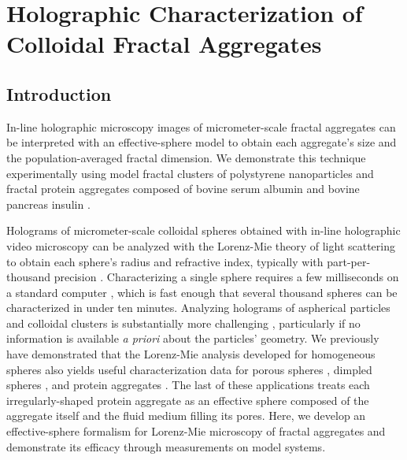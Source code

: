 \chapter{Holographic Characterization of Colloidal Fractal Aggregates}
\label{ch:fractal}

\section{Introduction}

In-line holographic microscopy images of micrometer-scale fractal
aggregates can be interpreted with an effective-sphere model
to obtain each aggregate's size and the population-averaged fractal dimension.
We demonstrate this technique experimentally using
model fractal clusters of polystyrene nanoparticles and 
fractal protein aggregates composed of bovine serum albumin and
bovine pancreas insulin \cite{wang16a}.

Holograms of micrometer-scale colloidal spheres
obtained with in-line holographic video microscopy
can be analyzed with the Lorenz-Mie theory of light
scattering to obtain each sphere's radius and refractive index,
typically with part-per-thousand precision \cite{lee07a,krishnatreya14}.
Characterizing a single sphere requires a few milliseconds
on a standard computer \cite{yevick14}, which is fast enough that several
thousand spheres can be characterized in under ten minutes.
Analyzing holograms of aspherical particles and colloidal
clusters is substantially more challenging \cite{fung12},
particularly if no information is available \emph{a priori}
about the particles' geometry.
We previously have demonstrated that the Lorenz-Mie analysis
developed for homogeneous spheres also yields useful
characterization data for porous spheres \cite{cheong11,wang15a}, 
dimpled spheres \cite{hannel15}, and protein aggregates \cite{wang16}.
The last of these applications treats each irregularly-shaped protein
aggregate as an effective sphere composed of the aggregate
itself and the fluid medium filling its pores.
Here, we develop an effective-sphere formalism for
Lorenz-Mie microscopy of fractal aggregates and
demonstrate its efficacy through measurements on model
systems.

